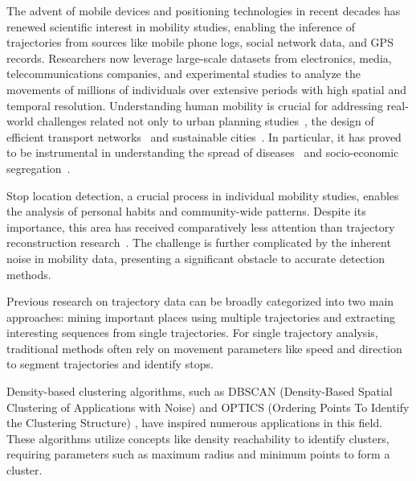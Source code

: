 \documentclass{article}
\begin{document}
The advent of mobile devices and positioning technologies in recent decades has renewed scientific interest in mobility studies, enabling the inference of trajectories from sources like mobile phone logs, social network data, and GPS records. Researchers now leverage large-scale datasets from electronics, media, telecommunications companies, and experimental studies to analyze the movements of millions of individuals over extensive periods with high spatial and temporal resolution. Understanding human mobility is crucial for addressing real-world challenges related not only to urban planning studies~\citep{DeNadai2016}, the design of efficient transport networks~\citep{Ferretti2018} and sustainable cities~\citep{Caitlin2015}. In particular, it has proved to be instrumental in understanding the spread of diseases~\citep{Moritz2020, Oliver2020, Aguilar-Sanchez2022, klein2023forecasting} and socio-economic segregation~\citep{Pappalardo2015, Centellegher2024}.

Stop location detection, a crucial process in individual mobility studies, enables the analysis of personal habits and community-wide patterns. Despite its importance, this area has received comparatively less attention than trajectory reconstruction research~\citep{Ramaswamy2004, Aslak2020}. The challenge is further complicated by the inherent noise in mobility data, presenting a significant obstacle to accurate detection methods.

Previous research on trajectory data can be broadly categorized into two main approaches: mining important places using multiple trajectories and extracting interesting sequences from single trajectories. For single trajectory analysis, traditional methods often rely on movement parameters like speed and direction to segment trajectories and identify stops.

Density-based clustering algorithms, such as DBSCAN (Density-Based Spatial Clustering of Applications with Noise) \citep{ester1996density} and OPTICS (Ordering Points To Identify the Clustering Structure) \citep{ankerst1999optics}, have inspired numerous applications in this field. These algorithms utilize concepts like density reachability to identify clusters, requiring parameters such as maximum radius and minimum points to form a cluster.
\end{document}
